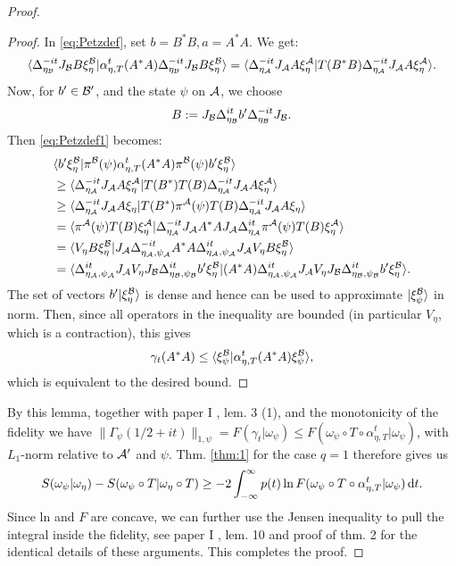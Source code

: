 \documentclass[english,a4paper,12pt]{article}
\def\cA{{\mathfrak A}}
\def\cB{{\mathfrak B}}
\newcommand{\ca}[1]{{\cal #1}}
\newcommand{\ben}{\begin{equation}}
\newcommand{\een}{\end{equation}}
\def\cA{{\ca A}}
\def\cB{{\ca B}}
\newcommand{\dd}{{\rm d}}
\renewcommand{\log}{\operatorname{ln}}
\begin{document}
\begin{proof}
\begin{proof}
In \eqref{eq:Petzdef}, set $b=B^* B, a=A^*A$. We get:
\ben
\label{eq:Petzdef1}
\langle  \Delta_{\eta_\cB}^{-it} J_\cB B \xi_{\eta}^{\cB} |  \alpha_{\eta,T}^t(A^*A) \Delta_{\eta_\cB}^{-it} J_\cB B \xi_{\eta}^{\cB} \rangle 
= \langle \Delta_{\eta_\cA}^{-it} J_\cA A \xi_{\eta}^{\cA} | T(B^* B) \Delta_{\eta_\cA}^{-it} J_\cA A \xi_{\eta}^{\cA} \rangle. 
\een
Now, for $b' \in \cB'$, and the state $\psi$ on $\cA$, we choose 
\ben
B:= J_\cB \Delta^{it}_{\eta_\cB} b' \Delta^{-it}_{\eta_\cB} J_\cB. 
\een
Then \eqref{eq:Petzdef1} becomes:
\ben
\begin{split}
&\langle  b' \xi_{\eta}^{\cB} |  \pi^\cB(\psi) \alpha_{\eta,T}^t(A^*A)  \pi^\cB(\psi) b'\xi_{\eta}^{\cB} \rangle \\
&\ge \langle \Delta_{\eta_\cA}^{-it} J_\cA A \xi_{\eta}^{\cA} | T(B^*)T(B) \Delta_{\eta_\cA}^{-it} J_\cA A \xi_{\eta}^{\cA} \rangle \\
&\ge \langle \Delta_{\eta_\cA}^{-it} J_\cA A \xi_\eta | T(B^*) \pi^\cA(\psi) T(B) \Delta_{\eta_\cA}^{-it} J_\cA A \xi_{\eta} \rangle \\
&= \langle \pi^\cA(\psi) T(B) \xi_{\eta}^{\cA} | \Delta_{\eta_\cA}^{-it} J_\cA A^* A J_\cA \Delta_{\eta_\cA}^{it} \pi^\cA(\psi) T(B) \xi_{\eta}^{\cA} \rangle \\
&= \langle V_\eta B \xi_{\eta}^{\cB} | J_\cA\Delta_{\eta_\cA,\psi_\cA}^{-it}  A^* A  \Delta_{\eta_\cA,\psi_\cA}^{it} J_\cA V_\eta B \xi_{\eta}^{\cB} \rangle \\
&= \langle \Delta_{\eta_\cA,\psi_\cA}^{it} J_\cA 
V_\eta J_\cB \Delta^{it}_{\eta_\cB,\psi_\cB}b' \xi_{\eta}^{\cB} |   (A^* A) \Delta_{\eta_\cA,\psi_\cA}^{it} J_\cA 
V_\eta J_\cB \Delta^{it}_{\eta_\cB,\psi_\cB}b' \xi_{\eta}^{\cB} \rangle.
\end{split}
\een
The set of vectors $b' |\xi_{\eta}^{\cB} \rangle$ is dense and hence can be used to approximate
$|\xi_{\psi}^{\cB} \rangle$ in norm. Then, since all operators in the inequality are bounded (in particular $V_\eta$, which is a contraction), 
this gives
\ben
\gamma_t(A^*A) \le \langle  \xi_{\psi}^{\cB} |  \alpha_{\eta,T}^t(A^*A)  \xi_{\psi}^{\cB} \rangle,
\een
which is equivalent to the desired bound.
\end{proof}

By this lemma, together with paper I  \cite{Faulkner:2020iou}, lem. 3 (1), and the monotonicity of the fidelity \cite{Uhlmann1977} 
we have $\| \Gamma_\psi(1/2+it)\|_{1,\psi} = F(\gamma_t|\omega_\psi) \le F(\omega_\psi \circ T \circ \alpha_{\eta,T}^t | \omega_\psi)$, with 
$L_1$-norm relative to $\cA'$ and $\psi$.  Thm.  \ref{thm:1} for the case $q=1$ therefore gives us
\ben
\label{eq:main1}
S(\omega_\psi | \omega_\eta) - S(\omega_\psi \circ T | \omega_\eta \circ T)
\ge 
-2 \int_{-\infty}^\infty p(t) \log F(\omega_\psi \circ T \circ \alpha_{\eta,T}^t|\omega_\psi)
\, \dd t . 
\een
Since ln and $F$ are concave, we can further use the Jensen inequality to pull the integral inside the fidelity, see 
paper I  \cite{Faulkner:2020iou}, lem. 10 and proof of thm. 2 for the identical details of these arguments. This completes the proof.
\end{proof}
\end{document}
